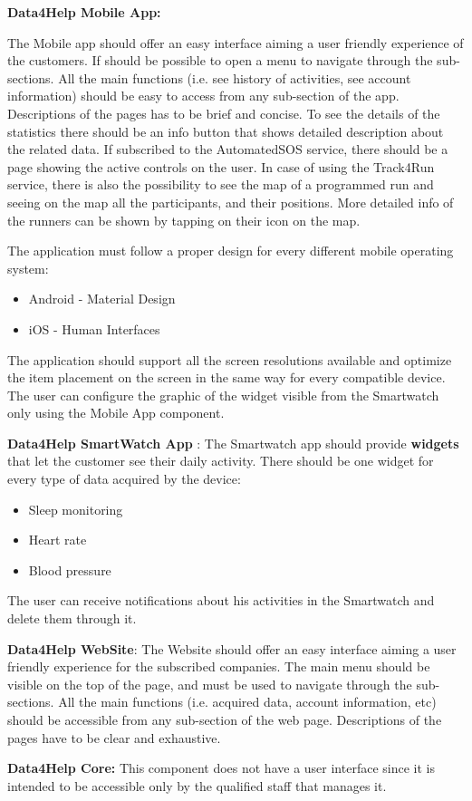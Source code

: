\textbf{Data4Help Mobile App:}

The Mobile app should offer an easy interface aiming a user friendly experience of the customers. If should be possible to open a menu to navigate through the sub-sections. All the main functions (i.e. see history of activities, see account information) should be easy to access from any sub-section of the app. 
Descriptions of the pages has to be brief and concise.
To see the details of the statistics there should be an info button that shows detailed description about the related data.
If subscribed to the AutomatedSOS service, there should be a page showing the active controls on the user.
In case of using the Track4Run service, there is also the possibility to see the map of a programmed run and seeing on the map all the participants, and their positions. More detailed info of the runners can be shown by tapping on their icon on the map.

The application must follow a proper design for every different mobile operating system:
\begin{itemize}
    \item Android - \vspace{0.3cm} Material Design
    \item iOS - \vspace{0.3cm} Human Interfaces
\end{itemize}
The application should support all the screen resolutions available and optimize the item placement on the screen in the same way for every compatible device.
\newline
The user can configure the graphic of the widget visible from the Smartwatch only using the Mobile App component.



\textbf{Data4Help SmartWatch App} :
The Smartwatch app should provide \textbf{widgets} that let the customer see their daily activity.
There should be one widget for every type of data acquired by the device:
\begin{itemize}
    \item Sleep monitoring 
    \item Heart rate
    \item Blood pressure
\end{itemize}
The user can receive notifications about his activities in the Smartwatch and delete them through it.
\newline

\textbf{Data4Help WebSite}: The Website should offer an easy interface aiming a user friendly experience for the subscribed companies. The main menu should be visible on the top of the page, and must be used to navigate through the sub-sections. All the main functions (i.e. acquired data, account information, etc) should be accessible from any sub-section of the web page. 
Descriptions of the pages have to be clear and exhaustive.
\newline

\textbf{Data4Help Core:} This component does not have a user interface since it is intended to be accessible only by the qualified staff that manages it. 